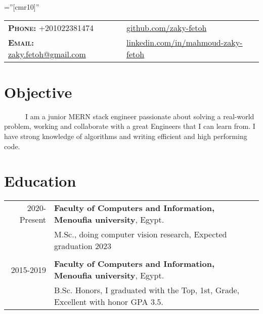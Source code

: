 \documentclass[a4paper,10pt]{article}
\begin{document}
\pagestyle{fancy}
\fancyhead{} 
\renewcommand{\headrulewidth}{0pt}

\font\fb=''[cmr10]'' 
\par{\bigskip\par} %


\begin{tabular}{lp{4cm}l}
\textbf{\textsc{Phone:}} +201022381474 && \href{https://github.com/zaky-fetoh}{github.com/zaky-fetoh} \\
\textbf{\textsc{Email:}}   \href{mailto:zaky.fetoh@gmail.com}{zaky.fetoh@gmail.com} &&\href{https://www.linkedin.com/in/mahmoud-zaky-fetoh/}{linkedin.com/in/mahmoud-zaky-fetoh}\\

\end{tabular}

\section{\textbf{Objective}}
~~~~~~I am a junior MERN stack engineer passionate about solving a real-world problem, working and collaborate with a great Engineers that I can learn from. I have strong knowledge of algorithms and writing efficient and high performing code. 

\section{\textbf{Education}}
\begin{tabular}{r|l}
    2020-Present  & \textbf{Faculty of Computers and Information, Menoufia university}, Egypt.\\ & M.Sc., doing computer vision research, Expected graduation  2023 \\
    &\\
    2015-2019 & \textbf{Faculty of Computers and Information, Menoufia university}, Egypt. \\ & B.Sc. Honors, I graduated with the Top, 1st, Grade, Excellent with honor GPA 3.5. \\
    \end{tabular}
\end{document}
